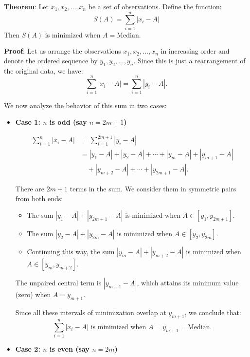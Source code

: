 \documentclass[twoside]{book}
\begin{document}
\begin{textbox}
\textbf{Theorem}: Let \( x_1, x_2, \ldots, x_n \) be a set of observations. Define the function:
\[
S(A) = \sum_{i=1}^n |x_i - A|
\]
Then \( S(A) \) is minimized when \( A = \text{Median} \).
\end{textbox}
\textbf{Proof}: Let us arrange the observations \( x_1, x_2, \ldots, x_n \) in increasing order and denote the ordered sequence by \( y_1, y_2, \ldots, y_n \). Since this is just a rearrangement of the original data, we have:
\[
\sum_{i=1}^n |x_i - A| = \sum_{i=1}^n |y_i - A|.
\]

We now analyze the behavior of this sum in two cases:

\begin{itemize}
    \item \textbf{Case 1: \( n \) is odd (say \( n = 2m + 1 \))}

    \begin{align*}
    \sum_{i=1}^{n} |x_i - A| &= \sum_{i=1}^{2m+1} |y_i - A| \\
    &= |y_1 - A| + |y_2 - A| + \cdots + |y_m - A| + |y_{m+1} - A| \\
    &\quad + |y_{m+2} - A| + \cdots + |y_{2m+1} - A|.
    \end{align*}

    There are \( 2m + 1 \) terms in the sum. We consider them in symmetric pairs from both ends:

    \begin{itemize}
        \item The sum \( |y_1 - A| + |y_{2m+1} - A| \) is minimized when \( A \in [y_1, y_{2m+1}] \).
        \item The sum \( |y_2 - A| + |y_{2m} - A| \) is minimized when \( A \in [y_2, y_{2m}] \).
        \item Continuing this way, the sum \( |y_m - A| + |y_{m+2} - A| \) is minimized when \( A \in [y_m, y_{m+2}] \).
    \end{itemize}

    The unpaired central term is \( |y_{m+1} - A| \), which attains its minimum value (zero) when \( A = y_{m+1} \).

    Since all these intervals of minimization overlap at \( y_{m+1} \), we conclude that:
    \[
    \sum_{i=1}^{n} |x_i - A| \text{ is minimized when } A = y_{m+1} = \text{Median}.
    \]

    \item \textbf{Case 2: \( n \) is even (say \( n = 2m \))}


\end{itemize}
\end{document}
